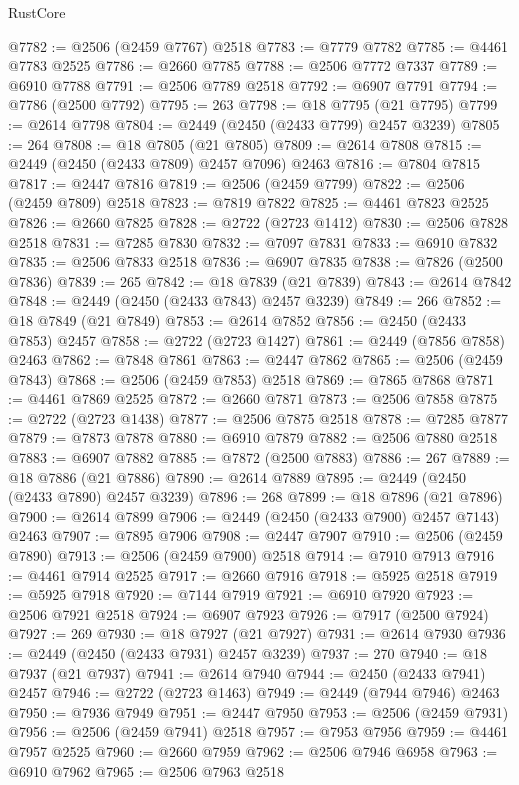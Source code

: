 \begin{lexlean}{RustCore}
\begin{coremodule}
@7782 := @2506 (@2459 @7767) @2518
@7783 := @7779 @7782
@7785 := @4461 @7783 @2525
@7786 := @2660 @7785
@7788 := @2506 @7772 @7337
@7789 := @6910 @7788
@7791 := @2506 @7789 @2518
@7792 := @6907 @7791
@7794 := @7786 (@2500 @7792)
@7795 := 263
@7798 := @18 @7795 (@21 @7795)
@7799 := @2614 @7798
@7804 := @2449 (@2450 (@2433 @7799) @2457 @3239)
@7805 := 264
@7808 := @18 @7805 (@21 @7805)
@7809 := @2614 @7808
@7815 := @2449 (@2450 (@2433 @7809) @2457 @7096) @2463
@7816 := @7804 @7815
@7817 := @2447 @7816
@7819 := @2506 (@2459 @7799)
@7822 := @2506 (@2459 @7809) @2518
@7823 := @7819 @7822
@7825 := @4461 @7823 @2525
@7826 := @2660 @7825
@7828 := @2722 (@2723 @1412)
@7830 := @2506 @7828 @2518
@7831 := @7285 @7830
@7832 := @7097 @7831
@7833 := @6910 @7832
@7835 := @2506 @7833 @2518
@7836 := @6907 @7835
@7838 := @7826 (@2500 @7836)
@7839 := 265
@7842 := @18 @7839 (@21 @7839)
@7843 := @2614 @7842
@7848 := @2449 (@2450 (@2433 @7843) @2457 @3239)
@7849 := 266
@7852 := @18 @7849 (@21 @7849)
@7853 := @2614 @7852
@7856 := @2450 (@2433 @7853) @2457
@7858 := @2722 (@2723 @1427)
@7861 := @2449 (@7856 @7858) @2463
@7862 := @7848 @7861
@7863 := @2447 @7862
@7865 := @2506 (@2459 @7843)
@7868 := @2506 (@2459 @7853) @2518
@7869 := @7865 @7868
@7871 := @4461 @7869 @2525
@7872 := @2660 @7871
@7873 := @2506 @7858
@7875 := @2722 (@2723 @1438)
@7877 := @2506 @7875 @2518
@7878 := @7285 @7877
@7879 := @7873 @7878
@7880 := @6910 @7879
@7882 := @2506 @7880 @2518
@7883 := @6907 @7882
@7885 := @7872 (@2500 @7883)
@7886 := 267
@7889 := @18 @7886 (@21 @7886)
@7890 := @2614 @7889
@7895 := @2449 (@2450 (@2433 @7890) @2457 @3239)
@7896 := 268
@7899 := @18 @7896 (@21 @7896)
@7900 := @2614 @7899
@7906 := @2449 (@2450 (@2433 @7900) @2457 @7143) @2463
@7907 := @7895 @7906
@7908 := @2447 @7907
@7910 := @2506 (@2459 @7890)
@7913 := @2506 (@2459 @7900) @2518
@7914 := @7910 @7913
@7916 := @4461 @7914 @2525
@7917 := @2660 @7916
@7918 := @5925 @2518
@7919 := @5925 @7918
@7920 := @7144 @7919
@7921 := @6910 @7920
@7923 := @2506 @7921 @2518
@7924 := @6907 @7923
@7926 := @7917 (@2500 @7924)
@7927 := 269
@7930 := @18 @7927 (@21 @7927)
@7931 := @2614 @7930
@7936 := @2449 (@2450 (@2433 @7931) @2457 @3239)
@7937 := 270
@7940 := @18 @7937 (@21 @7937)
@7941 := @2614 @7940
@7944 := @2450 (@2433 @7941) @2457
@7946 := @2722 (@2723 @1463)
@7949 := @2449 (@7944 @7946) @2463
@7950 := @7936 @7949
@7951 := @2447 @7950
@7953 := @2506 (@2459 @7931)
@7956 := @2506 (@2459 @7941) @2518
@7957 := @7953 @7956
@7959 := @4461 @7957 @2525
@7960 := @2660 @7959
@7962 := @2506 @7946 @6958
@7963 := @6910 @7962
@7965 := @2506 @7963 @2518

\end{coremodule}
\end{lexlean}
